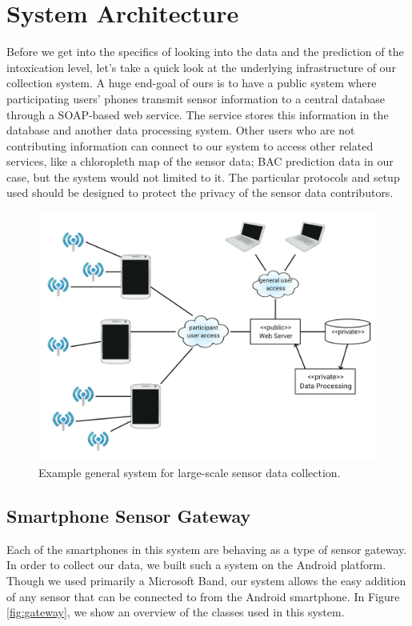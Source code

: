 \section{System Architecture}

Before we get into the specifics of looking into the data and the prediction of the intoxication level, let's take a quick look at the underlying infrastructure of our collection system. A huge end-goal of ours is to have a public system where participating users' phones transmit sensor information to a central database through a SOAP-based web service. The service stores this information in the database and another data processing system. Other users who are not contributing information can connect to our system to access other related services, like a chloropleth map of the sensor data; BAC prediction data in our case, but the system would not limited to it. The particular protocols and setup used should be designed to protect the privacy of the sensor data contributors.

\begin{figure}
	\includegraphics[width=1.0\textwidth]{../figs/system}
	\caption{Example general system for large-scale sensor data collection.}
	\label{fig:system}
\end{figure}

\subsection{Smartphone Sensor Gateway}

Each of the smartphones in this system are behaving as a type of sensor gateway. In order to collect our data, we built such a system on the Android platform. Though we used primarily a Microsoft Band, our system allows the easy addition of any sensor that can be connected to from the Android smartphone. In Figure \ref{fig:gateway}, we show an overview of the classes used in this system.

